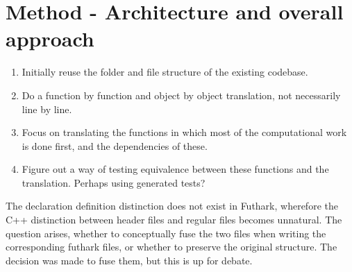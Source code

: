 \section{Method - Architecture and overall approach}
\begin{enumerate}
  \item Initially reuse the folder and file structure of the existing codebase.
  \item Do a function by function and object by object translation, not necessarily line by line.
  \item Focus on translating the functions in which most of the computational work is done first, and the dependencies of these.
  \item Figure out a way of testing equivalence between these functions and the translation. Perhaps using generated tests?
\end{enumerate}

The declaration definition distinction does not exist in Futhark, wherefore the C++ distinction between header files and regular files becomes unnatural. The question arises, whether to conceptually fuse the two files when writing the corresponding futhark files, or whether to preserve the original structure. The decision was made to fuse them, but this is up for debate.
